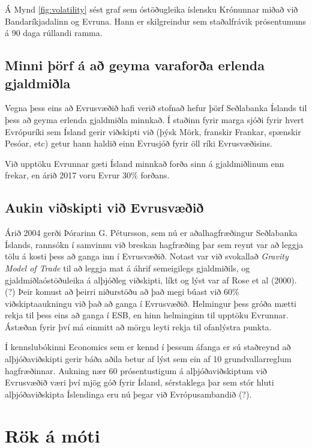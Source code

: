 \documentclass[a4paper]{article}
\begin{document}
Á Mynd \ref{fig:volatility} sést graf sem óstöðugleika íslensku Krónunnar miðað við Bandaríkjadalinn og Evruna. Hann er skilgreindur sem staðalfrávik prósentumuns á 90 daga rúllandi ramma.

\cite{icb_volatility_2008}

\subsection{Minni þörf á að geyma varaforða erlenda gjaldmiðla}

Vegna þess eins að Evrusvæðið hafi verið stofnað hefur þörf Seðlabanka Íslands til þess að geyma erlenda gjaldmiðla minnkað. Í staðinn fyrir marga sjóði fyrir hvert Evrópuríki sem Ísland gerir viðskipti við (þýsk Mörk, franskir Frankar, spænskir Pesóar, etc) getur hann haldið einn Evrusjóð fyrir öll ríki Evrusvæðisins.

Við upptöku Evrunnar gæti Ísland minnkað forða sinn á gjaldmiðlinum enn frekar\cite{saga_evropusamrunans}, en árið 2017 voru Evrur 30\% forðans.\cite{icb_annual_2017}

\subsection{Aukin viðskipti við Evrusvæðið}

Árið 2004 gerði Þórarinn G. Pétursson, sem nú er aðalhagfræðingur Seðlabanka Íslands, rannsókn í samvinnu við breskan hagfræðing þar sem reynt var að leggja tölu á kosti þess að ganga inn í Evrusvæðið. Notast var við svokallað \textit{Gravity Model of Trade} til að leggja mat á áhrif semeigilegs gjaldmiðils, og gjaldmiðlaóstöðuleika á alþjóðleg viðskipti, líkt og lýst var af Rose et al (2000).(?) Þeir komust að þeirri niðurstöðu að það megi búast við 60\% viðskiptaaukningu við það að ganga í Evrusvæðið. Helmingur þess gróða mætti rekja til þess eins að ganga í ESB, en hinn helminginn til upptöku Evrunnar. Ástæðan fyrir því má einmitt að mörgu leyti rekja til ofanlýstra punkta.\cite{icb_wp_26}

Í kennslubókinni Economics sem er kennd í þessum áfanga er sú staðreynd að alþjóðaviðskipti gerir báða aðila betur af lýst sem ein af 10 grundvallarreglum hagfræðinnar. Aukning nær 60 prósentustigum á alþjóðaviðskiptum við Evrusvæðið væri því mjög góð fyrir Ísland, sérstaklega þar sem stór hluti alþjóðaviðskipta Íslendinga eru nú þegar við Evrópusambandið (?).

\section{Rök á móti}
\end{document}
